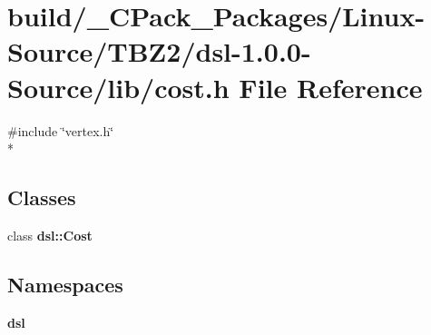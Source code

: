 \section{build/\-\_\-\-C\-Pack\-\_\-\-Packages/\-Linux-\/\-Source/\-T\-B\-Z2/dsl-\/1.0.0-\/\-Source/lib/cost.h File Reference}
\label{build_2__CPack__Packages_2Linux-Source_2TBZ2_2dsl-1_80_80-Source_2lib_2cost_8h}
{\ttfamily \#include \char`\"{}vertex.\-h\char`\"{}}\\*
\subsection*{Classes}
\begin{DoxyCompactItemize}
\item 
class {\bf dsl\-::\-Cost}
\end{DoxyCompactItemize}
\subsection*{Namespaces}
\begin{DoxyCompactItemize}
\item 
{\bf dsl}
\end{DoxyCompactItemize}
